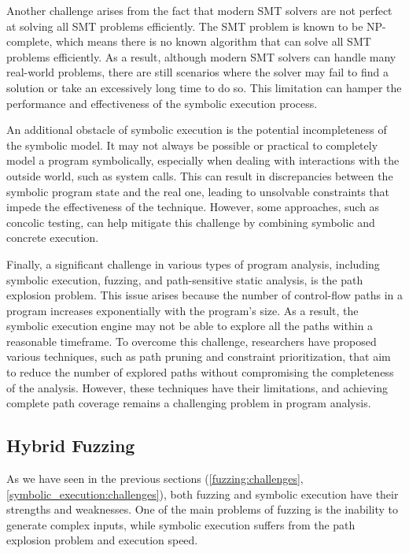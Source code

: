 
Another challenge arises from the fact that modern SMT solvers are not perfect at solving all SMT problems efficiently. The SMT problem is known to be NP-complete, which means there is no known algorithm that can solve all SMT problems efficiently. As a result, although modern SMT solvers can handle many real-world problems, there are still scenarios where the solver may fail to find a solution or take an excessively long time to do so. This limitation can hamper the performance and effectiveness of the symbolic execution process.


An additional obstacle of symbolic execution is the potential incompleteness of the symbolic model. It may not always be possible or practical to completely model a program symbolically, especially when dealing with interactions with the outside world, such as system calls. This can result in discrepancies between the symbolic program state and the real one, leading to unsolvable constraints that impede the effectiveness of the technique. However, some approaches, such as concolic testing, can help mitigate this challenge by combining symbolic and concrete execution.


Finally, a significant challenge in various types of program analysis, including symbolic execution, fuzzing, and path-sensitive static analysis, is the path explosion problem. This issue arises because the number of control-flow paths in a program increases exponentially with the program's size. As a result, the symbolic execution engine may not be able to explore all the paths within a reasonable timeframe. To overcome this challenge, researchers have proposed various techniques, such as path pruning and constraint prioritization, that aim to reduce the number of explored paths without compromising the completeness of the analysis. However, these techniques have their limitations, and achieving complete path coverage remains a challenging problem in program analysis.

\subsection{Hybrid Fuzzing}

As we have seen in the previous sections (\ref{fuzzing:challenges}, \ref{symbolic_execution:challenges}), both fuzzing and symbolic execution have their strengths and weaknesses. One of the main problems of fuzzing is the inability to generate complex inputs, while symbolic execution suffers from the path explosion problem and execution speed.

